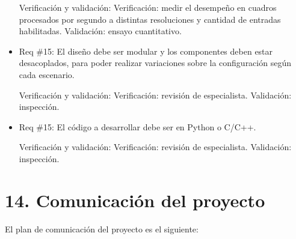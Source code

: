 \documentclass[11pt]{charter}
\begin{document}
\begin{itemize}
Verificación y validación:
\subitem Verificación: medir el desempeño en cuadros procesados por segundo a distintas resoluciones y cantidad de entradas habilitadas.
\subitem Validación: ensayo cuantitativo.

\item Req \#15:  El diseño debe ser modular y los componentes deben estar desacoplados, para poder realizar variaciones sobre la configuración según cada escenario.

Verificación y validación:
\subitem Verificación: revisión de especialista.
\subitem Validación: inspección.

\item Req \#15: El código a desarrollar debe ser en Python o C/C++.

Verificación y validación:
\subitem Verificación: revisión de especialista.
\subitem Validación: inspección.

\end{itemize} %


\section{14. Comunicación del proyecto}
\label{sec:comunicaciones}

El plan de comunicación del proyecto es el siguiente:
\end{document}
